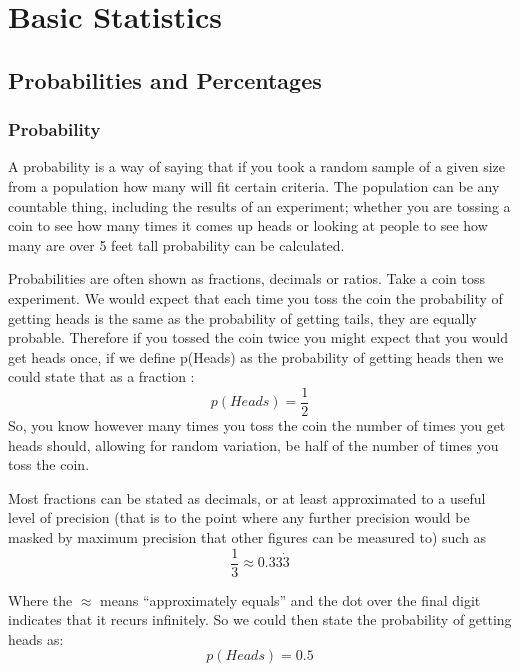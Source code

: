 \chapter{Basic Statistics} \label{Basic Statistics}
\section{Probabilities and Percentages}
\subsection{Probability}
A probability is a way of saying that if you took a random sample of a given  size from a population how many will fit certain criteria.  The population can be any countable thing, including the results of an experiment; whether you are tossing a coin to see how many times it comes up heads or looking at people to see how many are over 5 feet tall probability can be calculated.

Probabilities are often shown as fractions, decimals or ratios. Take a coin toss experiment.  We would expect that each time you toss the coin the probability of getting heads is the same as the probability of getting tails, they are equally probable.  Therefore if you tossed the coin twice you might expect that you would get heads once, if we define p(Heads) as the probability of getting heads then we could state that as a fraction
:
\begin{equation}
    p(Heads) = \frac{1}{2}
\end{equation}
So, you know however many times you toss the coin the number of times you get heads should, allowing for random variation, be half of the number of times you toss the coin.

Most fractions can be stated as decimals, or at least approximated to a useful level of precision (that is to the point where any further precision would be masked by maximum precision that other figures can be measured to) such as
\begin{equation}
    \frac{1}{3} \approx 0.33\dot3
\end{equation}

Where the $\approx$ means ``approximately equals'' and the dot over the final digit indicates that it recurs infinitely.  So we could then state the probability of getting heads as:
\begin{equation}
p(Heads) = 0.5
\end{equation}

